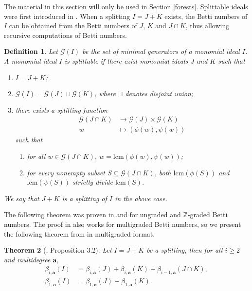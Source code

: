 \documentclass[dvipsnames,10pt]{article}
\newcommand{\lcm}{\mathrm{lcm}}
\newtheorem{theorem}{Theorem}[section]
\newtheorem{defi}[theorem]{Definition}
\begin{document}
The material in this section will only be used in Section \ref{forests}. Splittable ideals were first introduced in \cite{ELIAHOU19901}. When a splitting $I=J+K$ exists, the Betti numbers of $I$ can be obtained from the Betti numbers of $J$, $K$ and $J\cap K$, thus allowing recursive computations of Betti numbers.

\begin{defi}
    Let $\mathcal{G}(I)$ be the set of minimal generators of a monomial ideal $I$. A monomial ideal $I$ is \emph{splittable} if there exist monomial ideals $J$ and $K$ such that
    \begin{enumerate}
        \item $I=J+K$;
        \item $\mathcal{G}(I) = \mathcal{G}(J) \sqcup \mathcal{G}(K)$, where $\sqcup$ denotes disjoint union;
        \item there exists a splitting function \begin{align*}
            \mathcal{G}(J\cap K) &\to \mathcal{G}(J) \times \mathcal{G}(K)\\
            w &\mapsto (\phi(w),\psi(w))
        \end{align*}
        such that
        \begin{enumerate}
            \item for all $w\in \mathcal{G}(J\cap K)$, $w=\lcm (\phi(w),\psi(w))$;
            \item for every nonempty subset $S\subseteq \mathcal{G}(J\cap K)$, both $\lcm (\phi(S))$ and $\lcm (\psi(S))$ strictly divide $\lcm(S)$.
        \end{enumerate}
    \end{enumerate}
    We say that $J+K$ is a \emph{splitting} of $I$ in the above case.
\end{defi}

The following theorem was proven in \cite{ELIAHOU19901} and \cite{FATABBI200192} for ungraded and $\mathbb{Z}$-graded Betti numbers. The proof in \cite{FATABBI200192} also works for multigraded Betti numbers, so we present the following theorem from \cite{FATABBI200192} in multigraded format.

\begin{theorem}[\cite{FATABBI200192}, Proposition 3.2] 
    Let $I=J+K$ be a splitting, then for all $i\geqslant 2$ and multidegree $\mathbf{a}$,
    \begin{align*}
        \beta_{i,\mathbf{a}}(I) &= \beta_{i,\mathbf{a}}(J) + \beta_{i,\mathbf{a}}(K) + \beta_{i-1,\mathbf{a}}(J\cap K),\\
        \beta_{1,\mathbf{a}}(I) &= \beta_{1,\mathbf{a}}(J) + \beta_{1,\mathbf{a}}(K).
    \end{align*}
\end{theorem}
\end{document}
